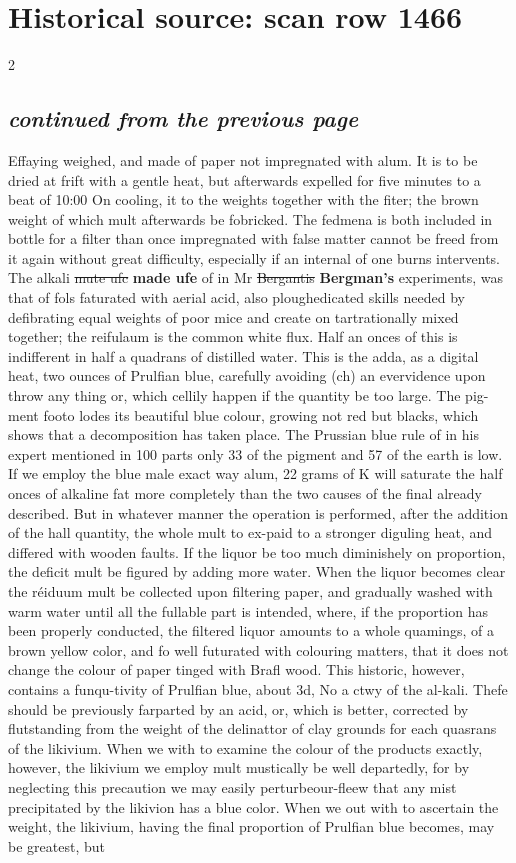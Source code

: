 \documentclass[10pt]{article}
\begin{document}
\section*{Historical source: scan row 1466}
\begin{multicols}{2}
\subsection*{\textit{continued from the previous page}}
Effaying weighed, and made of paper not impregnated with alum. It is to be dried at frift with a gentle heat, but afterwards expelled for five minutes to a beat of 10:00 On cooling, it to the weights together with the fiter; the brown weight of which mult afterwards be fobricked. The fedmena is both included in bottle for a filter than once impregnated with false matter cannot be freed from it again without great difficulty, especially if an internal of one burns intervents. The alkali \sout{mute ufc} \textbf{made ufe} of in Mr \sout{Bergantis} \textbf{Bergman's} experiments, was that of fols faturated with aerial acid, also ploughedicated skills needed by defibrating equal weights of poor mice and create on tartrationally mixed together; the reifulaum is the common white flux. Half an onces of this is indifferent in half a quadrans of distilled water. This is the adda, as a digital heat, two ounces of Prulfian blue, carefully avoiding (ch) an evervidence upon throw any thing or, which cellily happen if the quantity be too large. The pig-ment footo lodes its beautiful blue colour, growing not red but blacks, which shows that a decomposition has taken place. The Prussian blue rule of in his expert mentioned in 100 parts only 33 of the pigment and 57 of the earth is low. If we employ the blue male exact way alum, 22 grams of K will saturate the half onces of alkaline fat more completely than the two causes of the final already described. But in whatever manner the operation is performed, after the addition of the hall quantity, the whole mult to ex-paid to a stronger diguling heat, and differed with wooden faults. If the liquor be too much diminishely on proportion, the deficit mult be figured by adding more water. When the liquor becomes clear the réiduum mult be collected upon filtering paper, and gradually washed with warm water until all the fullable part is intended, where, if the proportion has been properly conducted, the filtered liquor amounts to a whole quamings, of a brown yellow color, and fo well futurated with colouring matters, that it does not change the colour of paper tinged with Brafl wood. This historic, however, contains a funqu-tivity of Prulfian blue, about 3d, No a ctwy of the al-kali. Thefe should be previously farparted by an acid, or, which is better, corrected by flutstanding from the weight of the delinattor of clay grounds for each quasrans of the likivium. When we with to examine the colour of the products exactly, however, the likivium we employ mult mustically be well departedly, for by neglecting this precaution we may easily perturbeour-fleew that any mist precipitated by the likivion has a blue color. When we out with to ascertain the weight, the likivium, having the final proportion of Prulfian blue becomes, may be greatest, but 
\end{multicols}
\end{document}
